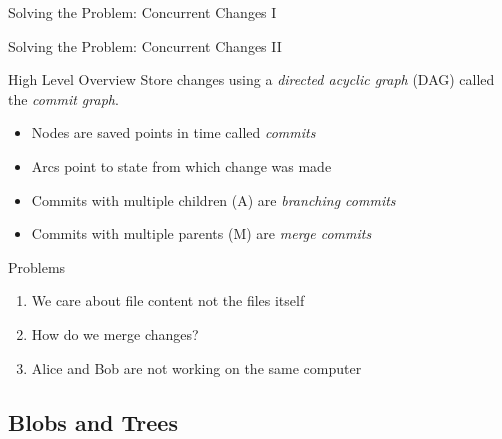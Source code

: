 \documentclass[xetex, handout]{beamer}
\begin{document}
\begin{frame}[fragile]{Solving the Problem: Concurrent Changes I}
\end{frame}

\begin{frame}{Solving the Problem: Concurrent Changes II}
  \begin{block}{High Level Overview}
    Store changes using a \emph{directed acyclic graph} (DAG) called
    the \emph{commit graph}.
    \begin{itemize}
      \item Nodes are saved points in time called \emph{commits}
      \item Arcs point to state from which change was made
      \item Commits with multiple children (A) are \emph{branching commits}
      \item Commits with multiple parents (M) are \emph{merge commits}
    \end{itemize}
  \end{block}
  \begin{alertblock}{Problems}
    \begin{enumerate}
      \item We care about file content not the files itself
      \item How do we merge changes?
      \item Alice and Bob are not working on the same computer
    \end{enumerate}
  \end{alertblock}
\end{frame}

\subsection{Blobs and Trees}
\end{document}
